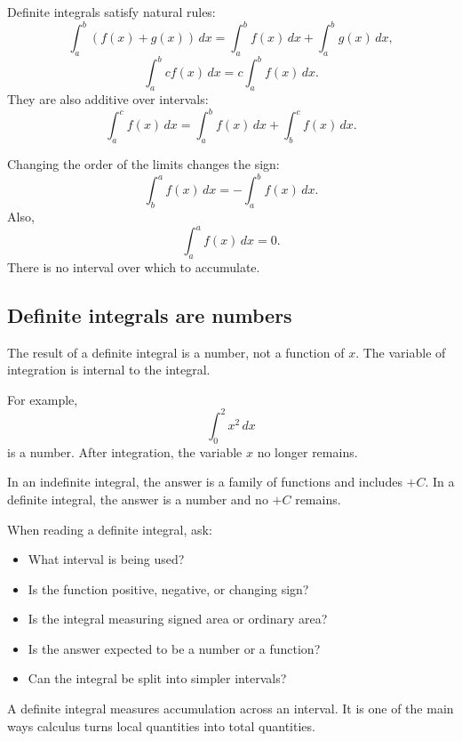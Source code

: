 Definite integrals satisfy natural rules:
\[
\int_a^b (f(x)+g(x))\,dx=\int_a^b f(x)\,dx+\int_a^b g(x)\,dx,
\]
\[
\int_a^b c f(x)\,dx=c\int_a^b f(x)\,dx.
\]
They are also additive over intervals:
\[
\int_a^c f(x)\,dx=\int_a^b f(x)\,dx+\int_b^c f(x)\,dx.
\]

Changing the order of the limits changes the sign:
\[
\int_b^a f(x)\,dx=-\int_a^b f(x)\,dx.
\]
Also,
\[
\int_a^a f(x)\,dx=0.
\]
There is no interval over which to accumulate.

\subsection*{Definite integrals are numbers}

The result of a definite integral is a number, not a function of \(x\). The variable of integration is internal to the integral.

For example,
\[
\int_0^2 x^2\,dx
\]
is a number. After integration, the variable \(x\) no longer remains.

\begin{remarkbox}
In an indefinite integral, the answer is a family of functions and includes \(+C\). In a definite integral, the answer is a number and no \(+C\) remains.
\end{remarkbox}

\begin{summarybox}
When reading a definite integral, ask:
\begin{itemize}
\item What interval is being used?
\item Is the function positive, negative, or changing sign?
\item Is the integral measuring signed area or ordinary area?
\item Is the answer expected to be a number or a function?
\item Can the integral be split into simpler intervals?
\end{itemize}
\end{summarybox}

A definite integral measures accumulation across an interval. It is one of the main ways calculus turns local quantities into total quantities.